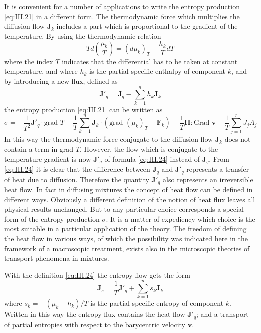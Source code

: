 It is convenient for a number of applications to write the entropy
production \eqref{eq:III.21} in a different form. The thermodynamic force which multiplies the diffusion flow $\bm{J}_k$ includes a part which is proportional to the gradient of the temperature. By using the thermodynamic relation
\begin{equation}
T d \left( \frac{\mu_k}{T} \right) = \left( d \mu_k \right)_T - \frac{h_k}{T} dT
    \label{eq:III.23}
\end{equation}
where the index $T$ indicates that the differential has to be taken at
constant temperature, and where $h_k$ is the partial specific enthalpy of component $k$, and by introducing a new flux, defined as
\begin{equation}
\bm{J}'_q = \bm{J}_q - \sum_{k=1}^{n} h_k \bm{J}_k
    \label{eq:III.24}
\end{equation}
the entropy production \eqref{eq:III.21} can be written as
\begin{equation}
\sigma = - \frac{1}{T^2} \bm{J}'_q \cdot \textrm{grad } T
- 
\frac{1}{T} \sum_{k=1}^{n} \bm{J}_k \cdot \left( \textrm{grad } \left( \mu_k \right)_T - \bm{F}_k \right)
- 
\frac{1}{T} \bm{\Pi} : \textrm{Grad } \bm{v} - \frac{1}{T} \sum_{j=1}^r J_j A_j
    \label{eq:III.25}
\end{equation}
In this way the thermodynamic force conjugate to the diffusion flow
$\bm{J}_k$ does not contain a term in grad $T$. However, the flow which is conjugate to the temperature gradient is now $\bm{J}'_q$ of formula \eqref{eq:III.24} instead of $\bm{J}_q$. From \eqref{eq:III.24} it is clear that the difference between $\bm{J}_q$ and $\bm{J}'_q$ represents a transfer of heat due to diffusion. Therefore the quantity $\bm{J}'_q$ also represents an irreversible heat flow. In fact in diffusing mixtures
the concept of heat flow can be defined in different ways. Obviously a
different definition of the notion of heat flux leaves all physical results unchanged. But to any particular choice corresponds a special form of the entropy production $\sigma$. It is a matter of expediency which choice is the most suitable in a particular application of the theory. The freedom of defining the heat flow in various ways, of which the possibility was indicated here in the framework of a macroscopic treatment, exists also in the microscopic theories of transport phenomena in mixtures.

With the definition \eqref{eq:III.24} the entropy flow gets the form
\begin{equation}
\bm{J}_s = \frac{1}{T} \bm{J}'_q + \sum_{k=1}^{n} s_k \bm{J}_k
    \label{eq:III.26}
\end{equation}
where $s_k = - (\mu_k - h_k)/T$ is the partial specific entropy of component $k$. Written in this way the entropy flux contains the heat flow $\bm{J}'_q$; and a transport of partial entropies with respect to the barycentric velocity $\bm{v}$.

